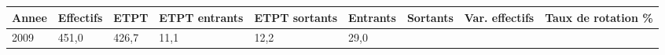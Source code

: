 \begin{longtable}[]{@{}lllllllll@{}}
\toprule
\begin{minipage}[b]{0.05\columnwidth}\raggedright
Annee\strut
\end{minipage} & \begin{minipage}[b]{0.08\columnwidth}\raggedright
Effectifs\strut
\end{minipage} & \begin{minipage}[b]{0.05\columnwidth}\raggedright
ETPT\strut
\end{minipage} & \begin{minipage}[b]{0.10\columnwidth}\raggedright
ETPT entrants\strut
\end{minipage} & \begin{minipage}[b]{0.10\columnwidth}\raggedright
ETPT sortants\strut
\end{minipage} & \begin{minipage}[b]{0.07\columnwidth}\raggedright
Entrants\strut
\end{minipage} & \begin{minipage}[b]{0.07\columnwidth}\raggedright
Sortants\strut
\end{minipage} & \begin{minipage}[b]{0.11\columnwidth}\raggedright
Var. effectifs\strut
\end{minipage} & \begin{minipage}[b]{0.14\columnwidth}\raggedright
Taux de rotation \%\strut
\end{minipage}\tabularnewline
\midrule
\endhead
\begin{minipage}[t]{0.05\columnwidth}\raggedright
2009\strut
\end{minipage} & \begin{minipage}[t]{0.08\columnwidth}\raggedright
451,0\strut
\end{minipage} & \begin{minipage}[t]{0.05\columnwidth}\raggedright
426,7\strut
\end{minipage} & \begin{minipage}[t]{0.10\columnwidth}\raggedright
11,1\strut
\end{minipage} & \begin{minipage}[t]{0.10\columnwidth}\raggedright
12,2\strut
\end{minipage} & \begin{minipage}[t]{0.07\columnwidth}\raggedright
29,0\strut
\end{minipage} & \begin{minipage}[t]{0.07\columnwidth}\raggedright

\end{minipage}
\end{longtable}

